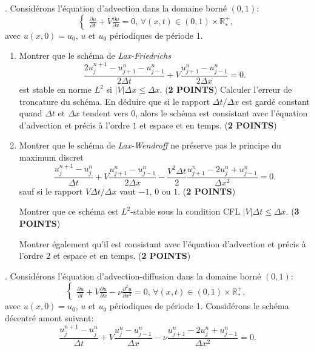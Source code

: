 \documentclass[12pt,a4paper]{article}
\begin{document}
. \noindent Consid\'erons l'\'equation d'advection dans la domaine born\'e $(0,1)$:
$$
\begin{cases}
\displaystyle\frac{\partial u}{\partial t}+V\frac{\partial u}{\partial
  x}=0,\, \forall (x,t)\in(0,1)\times\mathbb{R}^+_*,
\end{cases}
$$
avec $u(x, 0) = u_0$, $u$ et $u_0$ p\'eriodiques de p\'eriode 1.
\begin{enumerate}
\item Montrer que le sch\'ema de {\it Lax-Friedrichs} 
$$
\frac{2u_j^{n+1}-u_{j+1}^{n}-u_{j-1}^{n}}{2\Delta t}+V \frac{u_{j+1}^{n}-u_{j-1}^{n}}{2\Delta x}=0.
$$
est stable en norme $L^2$ si $|V|\Delta x \le \Delta x$. ({\bf 2 POINTS})
\newpage
Calculer l'erreur de troncature du sch\'ema.
En d\'eduire que si le rapport $\Delta t/\Delta x$ est gard\'e
constant quand $\Delta t$ et $\Delta x$ tendent vers $0$, alors le
sch\'ema est consistant avec l'\'equation d'advection et pr\'ecis \`a l'ordre $1$
et espace et en temps. ({\bf 2 POINTS})
\vspace{13cm}
\item  Montrer que le sch\'ema de {\it Lax-Wendroff} ne pr\'eserve pas le principe du maximum
discret
$$
\frac{u_j^{n+1}-u_{j}^{n}}{\Delta t}+V
\frac{u_{j+1}^{n}-u_{j-1}^{n}}{2\Delta x}-\frac{V^2\Delta t}{2}\frac{u_{j+1}^{n}-2u_j^n+u_{j-1}^{n}}{\Delta x^2}=0.
$$
sauf si le rapport $V\Delta t/\Delta x$ vaut $-1$, $0$ ou $1$. ({\bf 2 POINTS})


\newpage Montrer que ce sch\'ema  est $L^2$-stable sous la condition CFL $|V|\Delta t \le
\Delta x$. ({\bf 3 POINTS})

\vspace{16cm}
Montrer \'egalement qu'il est consistant avec l'\'equation d'advection et pr\'ecis \`a l'ordre $2$
et espace et en temps.  ({\bf 2 POINTS})
\end{enumerate}
\vspace{10cm}
. Consid\'erons l'\'equation d'advection-diffusion dans la domaine born\'e $(0,1)$:
$$
\begin{cases}
\displaystyle\frac{\partial u}{\partial t}+V\frac{\partial u}{\partial
  x}-\nu\frac{\partial^2u}{\partial x^2}=0,\, \forall (x,t)\in(0,1)\times\mathbb{R}^+_*,
\end{cases}
$$
avec $u(x, 0) = u_0$, $u$ et $u_0$ p\'eriodiques de p\'eriode 1.
Consid\'erons le sch\'ema d\'ecentr\'e amont suivant:
$$
\frac{u_j^{n+1}-u_{j}^{n}}{\Delta t}+V
\frac{u_{j}^{n}-u_{j-1}^{n}}{\Delta x}-\nu\frac{u_{j+1}^{n}-2u_j^n+u_{j-1}^{n}}{\Delta x^2}=0.
$$
\end{document}
